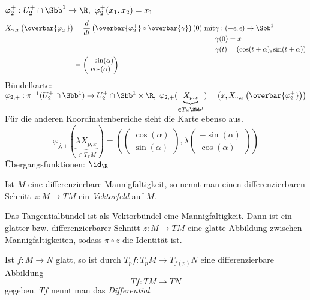 \begin{rem*}
	$ \varphi_2^+ : U_2^+ \cap \Sbb^1 \to \R,\ \varphi_2^+(x_1,x_2) = x_1 $
	\begin{align*}
		X_{\gamma,x}\left( \overbar{\varphi_2^+} \right) &= \frac{d}{dt} \left( \overbar{\varphi_2^+} \circ \overbar{\gamma} \right) (0)\ \text{mit} \begin{aligned}[t]
			&\gamma: (-\epsilon,\epsilon) \to \Sbb^1\\
			&\gamma(0) = x\\
			&\gamma(t) = (\cos(t+\alpha),\sin(t+\alpha))
		\end{aligned}\\
		&= \begin{pmatrix}
			-\sin(\alpha) \\ \cos(\alpha)
		\end{pmatrix}
	\end{align*}
	Bündelkarte: $\varphi_{2,+}: \pi^{-1}(U_2^+ \cap \Sbb^1) \to U_2^+ \cap \Sbb^1 \times \R,\ \varphi_{2,+}(\underbrace{X_{p,x}}_{\in Tx\Sbb^1}) = \left( x, X_{\gamma,x}\left( \overbar{\varphi_2^+} \right) \right)$\\
	Für die anderen Koordinatenbereiche sieht die Karte ebenso aus.
	$$ \varphi_{j,\pm} (\underbrace{\lambda X_{p,x}}_{\in T_xM}) = \left( \begin{pmatrix}
		\cos(\alpha)\\\sin(\alpha)
	\end{pmatrix}, \lambda \begin{pmatrix}
	-\sin(\alpha)\\\cos(\alpha)
	\end{pmatrix} \right) $$
	Übergangsfunktionen: $\id_\R$
\end{rem*}

\begin{defn}[Vektorfeld] 
 	Ist $M$ eine differenzierbare Mannigfaltigkeit, so nennt man einen differenzierbaren Schnitt $z: M \to TM$ ein \emph{Vektorfeld} auf $M$.
\end{defn}

\begin{rem*}
	Das Tangentialbündel ist als Vektorbündel eine Mannigfaltigkeit. Dann ist ein glatter bzw. differenzierbarer Schnitt $z: M \to TM$ eine glatte Abbildung zwischen Mannigfaltigkeiten, sodass $\pi \circ z$ die Identität ist.
\end{rem*}

\begin{defn}[Differential]
	Ist $ f: M \to N $ glatt, so ist durch $ T_pf: T_pM \to T_{f(p)}N $ eine differenzierbare Abbildung
	\[ Tf: TM \to TN \] gegeben. $Tf$ nennt man das \emph{Differential}.
\end{defn}